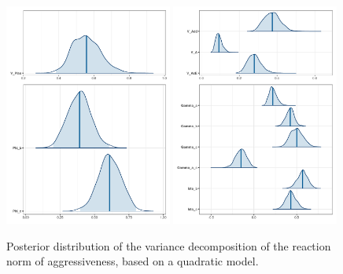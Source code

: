 \documentclass[a4paper,12pt,twoside]{article}
\begin{document}
\begin{figure}[t!b!]
  \includegraphics[width = 0.49\textwidth]{Aggressiveness_plas_ct.pdf}
  \includegraphics[width = 0.49\textwidth]{Aggressiveness_gen_ct.pdf}
  \caption{Posterior distribution of the variance decomposition of the reaction norm of aggressiveness, based on a quadratic model.}
  \label{fig_agr_var_decomp_ct}
\end{figure}
\end{document}
